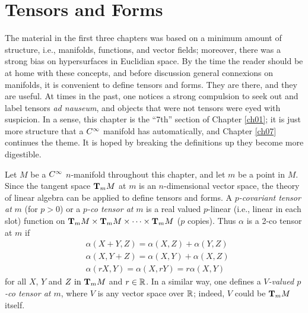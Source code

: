 \documentclass[../main]{subfiles}
\begin{document}
\section{Tensors and Forms}
The material in the first three chapters was based on a minimum amount of structure, i.e., manifolds, functions, and vector fields; moreover, there was a strong bias on hypersurfaces in Euclidian space. By the time the reader should be at home with these concepts, and before discussion general connexions on manifolds, it is convenient to define tensors and forms. They are there, and they are useful. At times in the past, one notices a strong compulsion to seek out and label tensors \emph{ad nauseum}, and objects that were not tensors were eyed with suspicion. In a sense, this chapter is the ``7th'' section of Chapter \ref{ch01}; it is just more structure that a $\CInfty$ manifold has automatically, and Chapter \ref{ch07} continues the theme. It is hoped by breaking the definitions up they become more digestible.

Let $M$ be a $\CInfty$ $n$-manifold throughout this chapter, and let $m$ be a point in $M$. Since the tangent space $\tangentspace{M}{m}$ at $m$ is an $n$-dimensional vector space, the theory of linear algebra can be applied to define tensors and forms. A $p$\emph{-covariant tensor at} $m$ (for $p> 0$) or a $p$\emph{-co tensor at} $m$ is a real valued $p$-linear (i.e., linear in each slot) function on $\tangentspace{M}{m} \times \tangentspace{M}{m} \times \cdots \times \tangentspace{M}{m}$ ($p$ copies). Thus $\alpha$ is a 2-co tensor at $m$ if 
\[
\begin{aligned}
&\alpha(X+Y, Z) = \alpha(X,Z) + \alpha(Y,Z)\\
&\alpha(X,Y+Z) = \alpha(X,Y) + \alpha(X,Z)\\
&\alpha(rX, Y) = \alpha(X, rY) = r\alpha(X, Y)
\end{aligned}
\]
for all $X$, $Y$ and $Z \InText \tangentspace{M}{m}$ and $r \in \bR$. In a similar way, one defines a \emph{$V$-valued $p$-co tensor at $m$}, where $V$ is any vector space over $\bR$; indeed, $V$ could be $\tangentspace{M}{m}$ itself.
\end{document}
